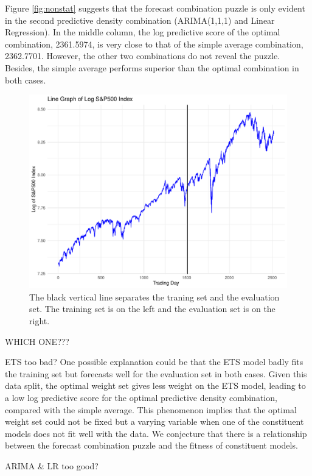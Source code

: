 \documentclass{monashthesis}
\begin{document}
Figure \ref{fig:nonstat} suggests that the forecast combination puzzle is only evident in the second predictive density combination (ARIMA(1,1,1) and Linear Regression). In the middle column, the log predictive score of the optimal combination, 2361.5974, is very close to that of the simple average combination, 2362.7701. However, the other two combinations do not reveal the puzzle. Besides, the simple average performs superior than the optimal combination in both cases.

\begin{figure}[ht]
\centering
\includegraphics[scale=0.4]{figures/log_linegraph.pdf}
\caption{The black vertical line separates the traning set and the evaluation set. The training set is on the left and the evaluation set is on the right.}
\label{fig:llg}
\end{figure}

WHICH ONE???

ETS too bad?
One possible explanation could be that the ETS model badly fits the training set but forecasts well for the evaluation set in both cases. Given this data split, the optimal weight set gives less weight on the ETS model, leading to a low log predictive score for the optimal predictive density combination, compared with the simple average. This phenomenon implies that the optimal weight set could not be fixed but a varying variable when one of the constituent models does not fit well with the data. We conjecture that there is a relationship between the forecast combination puzzle and the fitness of constituent models.

ARIMA \& LR too good?
\end{document}
